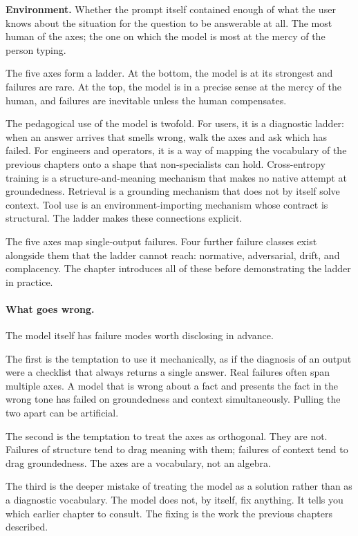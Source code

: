 \textbf{Environment.} Whether the prompt itself contained
enough of what the user knows about the situation for the
question to be answerable at all. The most human of the
axes; the one on which the model is most at the mercy of the
person typing.

The five axes form a ladder. At the bottom, the model is at
its strongest and failures are rare. At the top, the model is
in a precise sense at the mercy of the human, and failures
are inevitable unless the human compensates.

The pedagogical use of the model is twofold. For users, it is
a diagnostic ladder: when an answer arrives that smells wrong,
walk the axes and ask which has failed. For engineers and
operators, it is a way of mapping the vocabulary of the
previous chapters onto a shape that non-specialists can hold.
Cross-entropy training is a structure-and-meaning mechanism
that makes no native attempt at groundedness. Retrieval is a
grounding mechanism that does not by itself solve context.
Tool use is an environment-importing mechanism whose contract
is structural. The ladder makes these connections explicit.

The five axes map single-output failures. Four further failure
classes exist alongside them that the ladder cannot reach:
normative, adversarial, drift, and complacency. The chapter
introduces all of these before demonstrating the ladder in
practice.

\paragraph{What goes wrong.} The model itself has failure modes worth disclosing in
advance.

The first is the temptation to use it mechanically, as if the
diagnosis of an output were a checklist that always returns a
single answer. Real failures often span multiple axes. A
model that is wrong about a fact and presents the fact in the
wrong tone has failed on groundedness and context simultaneously.
Pulling the two apart can be artificial.

The second is the temptation to treat the axes as orthogonal.
They are not. Failures of structure tend to drag meaning with
them; failures of context tend to drag groundedness. The axes
are a vocabulary, not an algebra.

The third is the deeper mistake of treating the model as a
solution rather than as a diagnostic vocabulary. The model
does not, by itself, fix anything. It tells you which earlier
chapter to consult. The fixing is the work the previous
chapters described.

